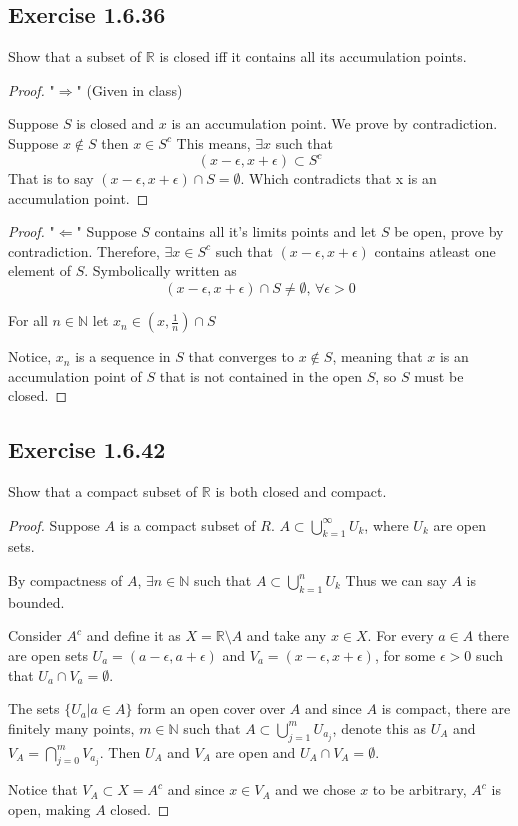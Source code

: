 \documentclass{tufte-book}
\theoremstyle{mytheoremstyle}
\theoremstyle{mylemstyle}
\theoremstyle{mydefstyle}
\begin{document}
\subsection{Exercise 1.6.36}
Show that a subset of $\mathbb{R}$ is closed iff it contains all its accumulation points.

\begin{proof}"$\Rightarrow$" (Given in class)

Suppose $S$ is closed and $x$ is an accumulation point.  We prove by contradiction.  Suppose $x \notin S$ then $x \in S^c$  This means, $\exists x$ such that
\[(x - \epsilon, x+\epsilon) \subset S^c \]
That is to say $(x-\epsilon, x+\epsilon) \cap S = \emptyset$.  Which contradicts that x is an accumulation point.
\end{proof}

\begin{proof}"$\Leftarrow$"
Suppose $S$ contains all it's limits points and let $S$ be open, prove by contradiction.  Therefore, $\exists x \in S^c$ such that $(x- \epsilon, x+\epsilon)$ contains atleast one element of $S$.  Symbolically written as
\[(x- \epsilon, x+\epsilon) \cap S \neq \emptyset \text{,  } \forall \epsilon > 0\]

For all $n \in \mathbb{N}$ let $x_n \in (x, \frac{1}{n}) \cap S$ 

Notice, ${x_n}$ is a sequence in $S$ that converges to $x \notin S$, meaning that $x$ is an accumulation point of $S$ that is not contained in the open $S$, so $S$ must be closed.
\end{proof}

\subsection{Exercise 1.6.42}
Show that a compact subset of $\mathbb{R}$ is both closed and compact.

\begin{proof}
Suppose $A$ is a compact subset of $R$.  $A \subset \bigcup\limits_{k=1}^{\infty}U_k$, where $U_k$ are open sets.

By compactness of $A$, $\exists n \in \mathbb{N}$ such that $A \subset \bigcup\limits_{k=1}^{n}U_k$ Thus we can say $A$ is bounded.

Consider $A^c$ and define it as $X = \mathbb{R} \setminus A$ and take any $x \in X$. For every $a \in A$ there are open sets $U_a = (a-\epsilon,a+\epsilon)$ and $V_a = (x-\epsilon, x+\epsilon)$, for some $\epsilon > 0$ such that $U_a \cap V_a = \emptyset$.

The sets $\{U_a | a \in A\}$ form an open cover over $A$ and since $A$ is compact, there are finitely many points, $m \in \mathbb{N}$ such that $A \subset \bigcup\limits_{j=1}^{m}U_{a_{j}}$, denote this as $U_A$ and $V_A=\bigcap\limits_{j=0}^{m}V_{a_{j}}$.  Then $U_A$ and $V_A$ are open and $U_A \cap V_A = \emptyset$.

Notice that $V_A \subset X = A^c$ and since $x \in V_A$ and we chose $x$ to be arbitrary,  $A^c$ is open, making $A$ closed.

\end{proof}
\end{document}
